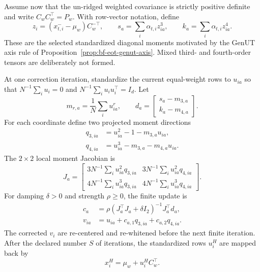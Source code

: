 Assume now that the un-ridged weighted covariance is strictly positive
definite and write \(C_wC_w^\top=P_w\).  With row-vector notation, define
\begin{equation}
 z_i=(x_{t,i}^{-}-\mu_w)C_w^{-\top},
 \qquad
 s_a=\sum_i\alpha_{t,i}z_{ia}^3,
 \qquad
 k_a=\sum_i\alpha_{t,i}z_{ia}^4.
 \label{eq:bf-eot-hm-target-moments}
\end{equation}
These are the selected standardized diagonal moments motivated by the GenUT
axis rule of Proposition~\ref{prop:bf-eot-genut-axis}.  Mixed third- and
fourth-order tensors are deliberately not formed.

At one correction iteration, standardize the current equal-weight rows to
\(u_{ia}\) so that \(N^{-1}\sum_i u_i=0\) and
\(N^{-1}\sum_i u_i u_i^\top=I_d\).  Let
\begin{equation}
 m_{r,a}=\frac1N\sum_i u_{ia}^r,
 \qquad d_a=\begin{bmatrix}s_a-m_{3,a}\\ k_a-m_{4,a}\end{bmatrix}.
 \label{eq:bf-eot-hm-moment-residual}
\end{equation}
For each coordinate define two projected moment directions
\begin{align}
 q_{3,ia}&=u_{ia}^2-1-m_{3,a}u_{ia},\\
 q_{4,ia}&=u_{ia}^3-m_{3,a}-m_{4,a}u_{ia}.
 \label{eq:bf-eot-hm-directions}
\end{align}
The \(2\times2\) local moment Jacobian is
\begin{equation}
 J_a=
 \begin{bmatrix}
 3N^{-1}\sum_i u_{ia}^2q_{3,ia} &
 3N^{-1}\sum_i u_{ia}^2q_{4,ia}\\
 4N^{-1}\sum_i u_{ia}^3q_{3,ia} &
 4N^{-1}\sum_i u_{ia}^3q_{4,ia}
 \end{bmatrix}.
 \label{eq:bf-eot-hm-jacobian}
\end{equation}
For damping \(\delta>0\) and strength \(\rho\geq0\), the finite update is
\begin{align}
 c_a&=\rho(J_a^\top J_a+\delta I_2)^{-1}J_a^\top d_a,
 \label{eq:bf-eot-hm-coefficients}\\
 v_{ia}&=u_{ia}+c_{a,1}q_{3,ia}+c_{a,2}q_{4,ia}.
 \label{eq:bf-eot-hm-correction}
\end{align}
The corrected \(v_i\) are re-centered and re-whitened before the next finite
iteration.  After the declared number \(S\) of iterations, the standardized
rows \(u_i^H\) are mapped back by
\begin{equation}
 x_i^H=\mu_w+u_i^H C_w^\top.
 \label{eq:bf-eot-hm-map-back}
\end{equation}

